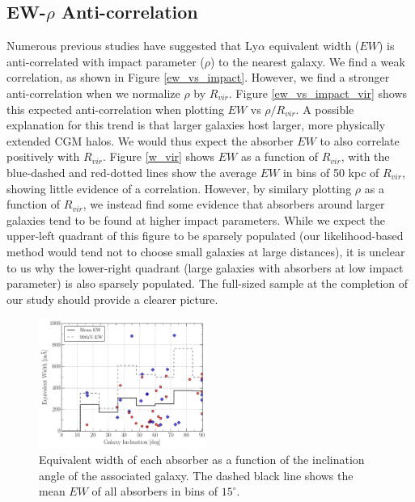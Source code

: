 \documentclass[twocolumn,tighten]{aastex6}
\begin{document}
\subsection{EW-$\rho$ Anti-correlation}
Numerous previous studies have suggested that Ly$\alpha$ equivalent width ($EW$) is anti-correlated with impact parameter ($\rho$) to the nearest galaxy. We find a weak correlation, as shown in Figure \ref{ew_vs_impact}. However, we find a stronger anti-correlation when we normalize $\rho$ by $R_{vir}$. Figure \ref{ew_vs_impact_vir} shows this expected anti-correlation when plotting $EW$ vs $\rho/R_{vir}$. A possible explanation for this trend is that larger galaxies host larger, more physically extended CGM halos. We would thus expect the absorber $EW$ to also correlate positively with $R_{vir}$. Figure \ref{w_vir} shows $EW$ as a function of $R_{vir}$, with the blue-dashed and red-dotted lines show the average $EW$ in bins of 50 kpc of $R_{vir}$, showing little evidence of a correlation. However, by similary plotting $\rho$ as a function of $R_{vir}$, we instead find some evidence that absorbers around larger galaxies tend to be found at higher impact parameters. While we expect the upper-left quadrant of this figure to be sparsely populated (our likelihood-based method would tend not to choose small galaxies at large distances), it is unclear to us why the lower-right quadrant (large galaxies with absorbers at low impact parameter) is also sparsely populated. The full-sized sample at the completion of our study should provide a clearer picture.


\begin{figure}[h!]
        \centering
        \includegraphics[width=0.49\textwidth]{fig8.pdf}
        \caption{\small{Equivalent width of each absorber as a function of the inclination angle of the associated galaxy. The dashed black line shows the mean $EW$ of all absorbers in bins of $15^{\circ}$.}}
        \label{ew_vs_inclination}
        \vspace{2pt}
\end{figure}
\end{document}
